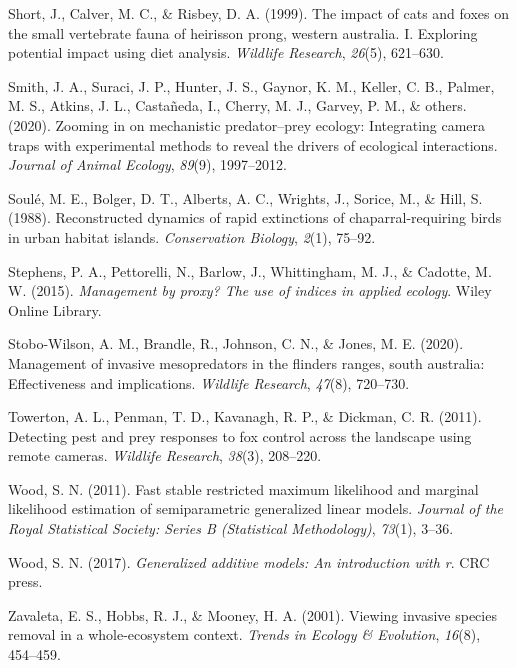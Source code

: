 \documentclass[]{elsarticle} %
\begin{document}
\leavevmode\hypertarget{ref-short1999}{}%
Short, J., Calver, M. C., \& Risbey, D. A. (1999). The impact of cats and foxes on the small vertebrate fauna of heirisson prong, western australia. I. Exploring potential impact using diet analysis. \emph{Wildlife Research}, \emph{26}(5), 621--630.

\leavevmode\hypertarget{ref-smith2020}{}%
Smith, J. A., Suraci, J. P., Hunter, J. S., Gaynor, K. M., Keller, C. B., Palmer, M. S., Atkins, J. L., Castañeda, I., Cherry, M. J., Garvey, P. M., \& others. (2020). Zooming in on mechanistic predator--prey ecology: Integrating camera traps with experimental methods to reveal the drivers of ecological interactions. \emph{Journal of Animal Ecology}, \emph{89}(9), 1997--2012.

\leavevmode\hypertarget{ref-soule1988}{}%
Soulé, M. E., Bolger, D. T., Alberts, A. C., Wrights, J., Sorice, M., \& Hill, S. (1988). Reconstructed dynamics of rapid extinctions of chaparral-requiring birds in urban habitat islands. \emph{Conservation Biology}, \emph{2}(1), 75--92.

\leavevmode\hypertarget{ref-stephens2015}{}%
Stephens, P. A., Pettorelli, N., Barlow, J., Whittingham, M. J., \& Cadotte, M. W. (2015). \emph{Management by proxy? The use of indices in applied ecology}. Wiley Online Library.

\leavevmode\hypertarget{ref-stobo2020management}{}%
Stobo-Wilson, A. M., Brandle, R., Johnson, C. N., \& Jones, M. E. (2020). Management of invasive mesopredators in the flinders ranges, south australia: Effectiveness and implications. \emph{Wildlife Research}, \emph{47}(8), 720--730.

\leavevmode\hypertarget{ref-towerton2011}{}%
Towerton, A. L., Penman, T. D., Kavanagh, R. P., \& Dickman, C. R. (2011). Detecting pest and prey responses to fox control across the landscape using remote cameras. \emph{Wildlife Research}, \emph{38}(3), 208--220.

\leavevmode\hypertarget{ref-wood2011}{}%
Wood, S. N. (2011). Fast stable restricted maximum likelihood and marginal likelihood estimation of semiparametric generalized linear models. \emph{Journal of the Royal Statistical Society: Series B (Statistical Methodology)}, \emph{73}(1), 3--36.

\leavevmode\hypertarget{ref-wood2017}{}%
Wood, S. N. (2017). \emph{Generalized additive models: An introduction with r}. CRC press.

\leavevmode\hypertarget{ref-zavaleta2001}{}%
Zavaleta, E. S., Hobbs, R. J., \& Mooney, H. A. (2001). Viewing invasive species removal in a whole-ecosystem context. \emph{Trends in Ecology \& Evolution}, \emph{16}(8), 454--459.
\end{document}
